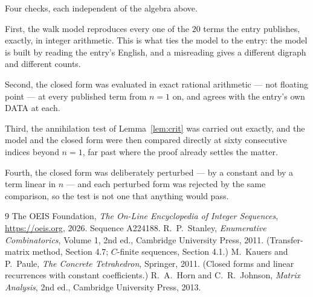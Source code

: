 \documentclass[11pt,a4paper]{article}
\theoremstyle{plain}
\theoremstyle{definition}
\begin{document}
Four checks, each independent of the algebra above.

First, the walk model reproduces every one of the $20$ terms the entry publishes,
exactly, in integer arithmetic. This is what ties the model to the entry: the model is built
by reading the entry's English, and a misreading gives a different digraph and different
counts.

Second, the closed form was evaluated in exact rational arithmetic --- not floating point ---
at every published term from $n=1$ on, and agrees with the entry's own DATA at each.

Third, the annihilation test of Lemma~\ref{lem:crit} was carried out exactly, and the model
and the closed form were then compared directly at sixty consecutive indices beyond
$n=1$, far past where the proof already settles the matter.

Fourth, the closed form was deliberately perturbed --- by a constant and by a term linear in
$n$ --- and each perturbed form was rejected by the same comparison, so the test is not one
that anything would pass.

\begin{thebibliography}{9}
 The OEIS Foundation, \emph{The On-Line Encyclopedia of Integer
Sequences}, \url{https://oeis.org}, 2026. Sequence A224188.
 R.~P.~Stanley, \emph{Enumerative Combinatorics}, Volume 1, 2nd ed.,
Cambridge University Press, 2011. (Transfer-matrix method, Section 4.7; $C$-finite sequences,
Section 4.1.)
 M.~Kauers and P.~Paule, \emph{The Concrete Tetrahedron}, Springer, 2011.
(Closed forms and linear recurrences with constant coefficients.)
 R.~A.~Horn and C.~R.~Johnson, \emph{Matrix Analysis}, 2nd ed., Cambridge
University Press, 2013.
\end{thebibliography}
\end{document}
